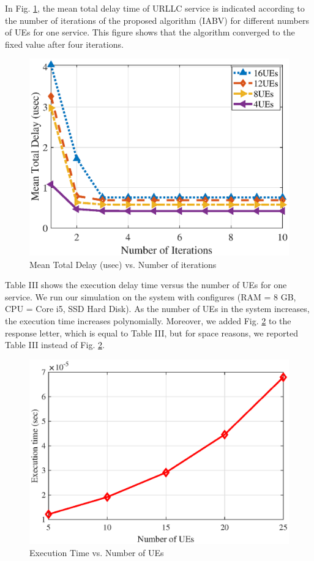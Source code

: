 \documentclass[12pt, letterpaper]{article}
\begin{document}
In Fig. \ref{fig:2}, the mean total delay time of URLLC service is indicated according to the number of iterations of the
proposed algorithm (IABV) for different numbers of UEs for one service. This figure shows that the algorithm converged to the fixed value after four iterations.
\begin{figure}[H]
  \centering
    \includegraphics[scale = 0.5]{iterD.eps}
  \caption{Mean Total Delay (usec) vs. Number of iterations}
  \label{fig:2}
\end{figure}

Table III shows the execution delay time versus the number of UEs for one service. We run our simulation on the system with configures (RAM = 8 GB, CPU = Core i5, SSD Hard Disk). 
 As the number of UEs in the system increases, the execution time increases polynomially. 
Moreover, we added Fig. \ref{fig:3} to the response letter, which is equal to Table III, but for space reasons, we reported Table III instead of Fig. \ref{fig:3}.
\begin{figure}[H]
  \centering
    \includegraphics[scale = 0.5]{exec.eps}
  \caption{Execution Time vs. Number of UEs}
  \label{fig:3}
\end{figure} 
 
\end{document}
